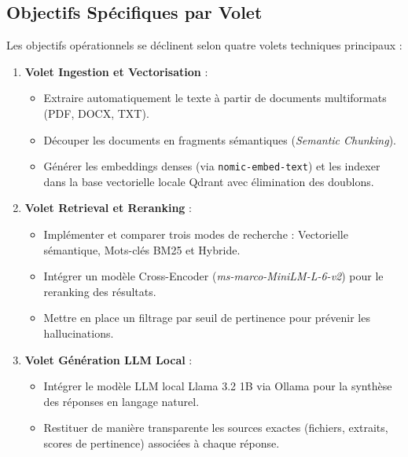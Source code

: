 \subsection{Objectifs Spécifiques par Volet}
Les objectifs opérationnels se déclinent selon quatre volets techniques principaux :

\begin{enumerate}
    \item \textbf{Volet Ingestion et Vectorisation} :
    \begin{itemize}
        \item Extraire automatiquement le texte à partir de documents multiformats (PDF, DOCX, TXT).
        \item Découper les documents en fragments sémantiques (\textit{Semantic Chunking}).
        \item Générer les embeddings denses (via \texttt{nomic-embed-text}) et les indexer dans la base vectorielle locale Qdrant avec élimination des doublons.
    \end{itemize}

    \item \textbf{Volet Retrieval et Reranking} :
    \begin{itemize}
        \item Implémenter et comparer trois modes de recherche : Vectorielle sémantique, Mots-clés BM25 et Hybride.
        \item Intégrer un modèle Cross-Encoder (\textit{ms-marco-MiniLM-L-6-v2}) pour le reranking des résultats.
        \item Mettre en place un filtrage par seuil de pertinence pour prévenir les hallucinations.
    \end{itemize}

    \item \textbf{Volet Génération LLM Local} :
    \begin{itemize}
        \item Intégrer le modèle LLM local Llama 3.2 1B via Ollama pour la synthèse des réponses en langage naturel.
        \item Restituer de manière transparente les sources exactes (fichiers, extraits, scores de pertinence) associées à chaque réponse.
    \end{itemize}


\end{enumerate}
